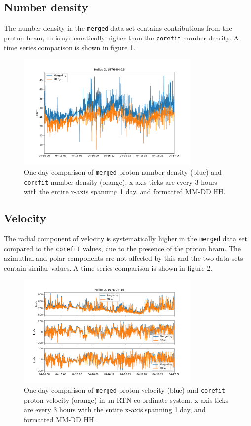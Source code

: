 \documentclass[11pt,a4paper]{article}
\begin{document}
\subsection{Number density}
The number density in the \texttt{merged} data set contains contributions from the proton beam, so is systematically higher than the \texttt{corefit} number density. A time series comparison is shown in figure \ref{fig:density}.
\begin{figure}
	\centering
	\includegraphics[width=0.8\textwidth]{density_comparison}
	\caption{One day comparison of \texttt{merged} proton number density (blue) and \texttt{corefit} number density (orange). x-axis ticks are every 3 hours with the entire x-axis spanning 1 day, and formatted MM-DD HH.}
	\label{fig:density}
\end{figure}

\subsection{Velocity}
The radial component of velocity is systematically higher in the \texttt{merged} data set compared to the \texttt{corefit} values, due to the presence of the proton beam. The azimuthal and polar components are not affected by this and the two data sets contain similar values. A time series comparison is shown in figure \ref{fig:velocity}.
\begin{figure}
	\centering
	\includegraphics[width=0.8\textwidth]{velocity_comparison}
	\caption{One day comparison of \texttt{merged} proton velocity (blue) and \texttt{corefit} proton velocity (orange) in an RTN co-ordinate system. x-axis ticks are every 3 hours with the entire x-axis spanning 1 day, and formatted MM-DD HH.}
	\label{fig:velocity}
\end{figure}
\end{document}
